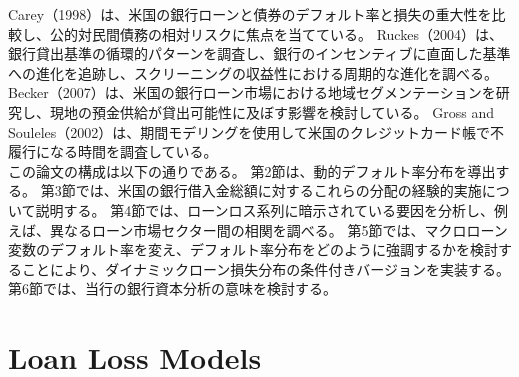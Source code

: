 \documentclass[a4j,12pt]{jarticle}
\begin{document}
Carey（1998）は、米国の銀行ローンと債券のデフォルト率と損失の重大性を比較し、公的対民間債務の相対リスクに焦点を当てている。 
Ruckes（2004）は、銀行貸出基準の循環的パターンを調査し、銀行のインセンティブに直面した基準への進化を追跡し、スクリーニングの収益性における周期的な進化を調べる。
Becker（2007）は、米国の銀行ローン市場における地域セグメンテーションを研究し、現地の預金供給が貸出可能性に及ぼす影響を検討している。
Gross and Souleles（2002）は、期間モデリングを使用して米国のクレジットカード帳で不履行になる時間を調査している。\\
\indent この論文の構成は以下の通りである。 第2節は、動的デフォルト率分布を導出する。 第3節では、米国の銀行借入金総額に対するこれらの分配の経験的実施について説明する。 第4節では、ローンロス系列に暗示されている要因を分析し、例えば、異なるローン市場セクター間の相関を調べる。 第5節では、マクロローン変数のデフォルト率を変え、デフォルト率分布をどのように強調するかを検討することにより、ダイナミックローン損失分布の条件付きバージョンを実装する。 第6節では、当行の銀行資本分析の意味を検討する。
\section{Loan Loss Models}
\end{document}
